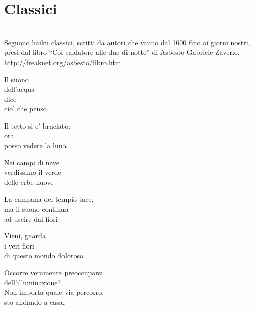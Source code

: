 \section{Classici}

\leavevmode\\[0.25in]

Seguono haiku classici, scritti da autori che vanno dal 1600 fino ai giorni nostri, presi dal libro ``Col saldatore alle due di notte'' di Asbesto Gabriele Zaverio,\\
\url{http://freaknet.org/asbesto/libro.html}

\vfill

\begin{haiku}
Il suono\\
dell'acqua\\
dice\\
cio' che penso\\
\end{haiku}

\begin{haiku}
Il tetto si e' bruciato:\\
ora\\
posso vedere la luna\\
\end{haiku}

\begin{haiku}
Nei campi di neve\\
verdissimo il verde\\
delle erbe nuove\\
\end{haiku}

\begin{haiku}
La campana del tempio tace,\\
ma il suono continua\\
ad uscire dai fiori\\
\end{haiku}

\label{dolorosoMondo}
\begin{haiku}
Vieni, guarda\\
i veri fiori\\
di questo mondo doloroso.\\
\end{haiku}

\begin{haiku}
Occorre veramente preoccuparsi\\
dell'illuminazione?\\
Non importa quale via percorro,\\
sto andando a casa.\\
\end{haiku}


